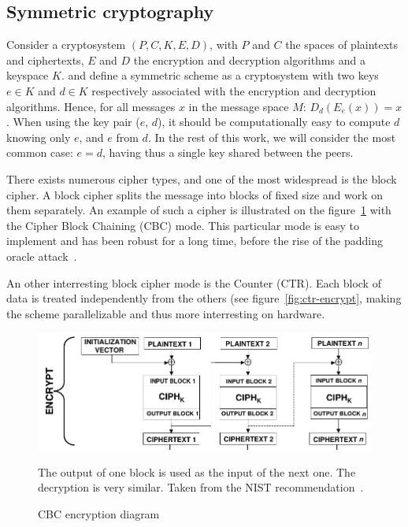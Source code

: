 \subsection{Symmetric cryptography}\label{sec:symmetric}
Consider a cryptosystem $(P,C,K,E,D)$, with $P$ and $C$ the spaces of plaintexts and ciphertexts, $E$ and $D$ the encryption and decryption algorithms and a keyspace $K$.
\citet{Menezes1996} and \citet{infof405} define a symmetric scheme as a cryptosystem with two keys $e \in K$ and $d \in K$ respectively associated with the encryption and decryption algorithms.
Hence, for all messages $x$ in the message space $M$: $D_d(E_e(x)) = x$.
When using the key pair ($e$, $d$), it should be computationally easy to compute $d$ knowing only $e$, and $e$ from $d$.
In the rest of this work, we will consider the most common case: $e = d$, having thus a single key shared between the peers.

There exists numerous cipher types, and one of the most widespread is the block cipher.
A block cipher splits the message into blocks of fixed size and work on them separately.
An example of such a cipher is illustrated on the figure~\ref{fig:cbc-encrypt} with the Cipher Block Chaining (CBC) mode.
This particular mode is easy to implement and has been robust for a long time, before the rise of the padding oracle attack~\cite{vaudenay2002}.

\indent An other interresting block cipher mode is the Counter (CTR).
Each block of data is treated independently from the others (see figure~\ref{fig:ctr-encrypt}, making the scheme parallelizable and thus more interresting on hardware.

\begin{figure}
\includegraphics[width=\textwidth]{nist-cbc}
\caption{CBC encryption diagram}{The output of one block is used as the input of the next one. The decryption is very similar. Taken from the NIST recommendation~\cite{nist-sp800-38A}.}
\label{fig:cbc-encrypt}
\end{figure}

